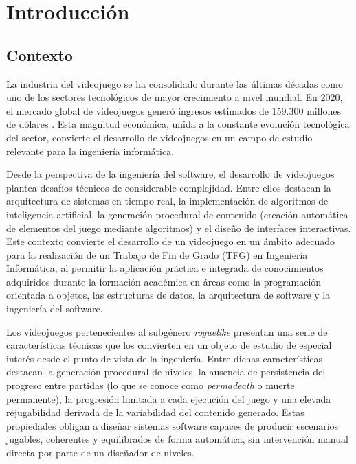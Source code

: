 ﻿\chapter{Introducción}


\section{Contexto}


La industria del videojuego se ha consolidado durante las últimas décadas como uno de los sectores tecnológicos de mayor crecimiento a nivel mundial. En 2020, el mercado global de videojuegos generó ingresos estimados de 159.300 millones de dólares \cite{NEWZOO_GLOBAL_GAMES_MARKET_REPORT_2020_LIGHT}. Esta magnitud económica, unida a la constante evolución tecnológica del sector, convierte el desarrollo de videojuegos en un campo de estudio relevante para la ingeniería informática.

Desde la perspectiva de la ingeniería del software, el desarrollo de videojuegos plantea desafíos técnicos de considerable complejidad. Entre ellos destacan la arquitectura de sistemas en tiempo real, la implementación de algoritmos de inteligencia artificial, la generación procedural de contenido (creación automática de elementos del juego mediante algoritmos) y el diseño de interfaces interactivas. Este contexto convierte el desarrollo de un videojuego en un ámbito adecuado para la realización de un Trabajo de Fin de Grado (TFG) en Ingeniería Informática, al permitir la aplicación práctica e integrada de conocimientos adquiridos durante la formación académica en áreas como la programación orientada a objetos, las estructuras de datos, la arquitectura de software y la ingeniería del software.

Los videojuegos pertenecientes al subgénero \textit{roguelike} presentan una serie de características técnicas que los convierten en un objeto de estudio de especial interés desde el punto de vista de la ingeniería. Entre dichas características destacan la generación procedural de niveles, la ausencia de persistencia del progreso entre partidas (lo que se conoce como \textit{permadeath} o muerte permanente), la progresión limitada a cada ejecución del juego y una elevada rejugabilidad derivada de la variabilidad del contenido generado. Estas propiedades obligan a diseñar sistemas software capaces de producir escenarios jugables, coherentes y equilibrados de forma automática, sin intervención manual directa por parte de un diseñador de niveles.

